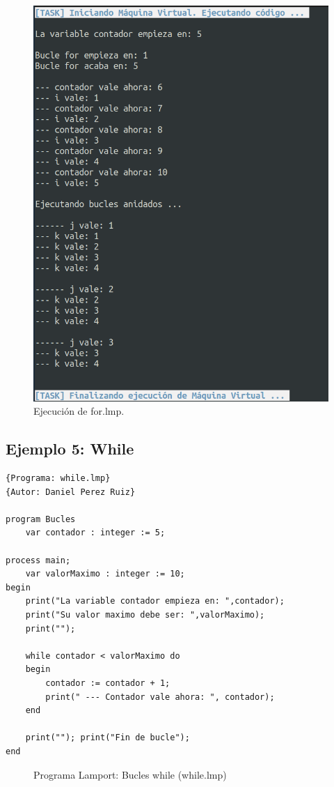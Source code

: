 \newpage
\begin{figure}[!h]
    \includegraphics[scale=0.5]{images/ejemplos/for.png}
    \caption{Ejecución de for.lmp.}
    \label{fig:lamportFor_exec}
\end{figure}

\newpage
\subsection{Ejemplo 5: While}
\begin{lstlisting}[style=lamportStyle]
{Programa: while.lmp}
{Autor: Daniel Perez Ruiz}

program Bucles
	var contador : integer := 5;

process main;
	var valorMaximo : integer := 10;
begin
	print("La variable contador empieza en: ",contador);
	print("Su valor maximo debe ser: ",valorMaximo);
	print("");
	
	while contador < valorMaximo do
	begin
		contador := contador + 1;
		print(" --- Contador vale ahora: ", contador);
	end
	
	print(""); print("Fin de bucle");
end
\end{lstlisting}
\begin{figure}[h]
\caption{Programa Lamport: Bucles while (while.lmp)}
\label{fig:lamportWhile}
\end{figure}

